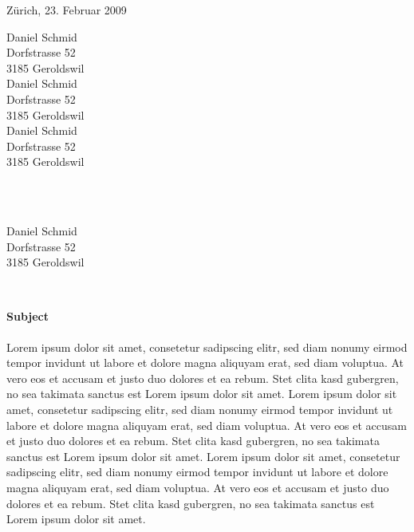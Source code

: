 \documentclass[a4paper,12pt]{letter}
\begin{document}
\thispagestyle{fancy}
\renewcommand{\headrulewidth}{0pt}
\cfoot{}

\hspace{90mm}Zürich, 23. Februar 2009
\\\par\hspace{90mm}\parbox[t][05mm]{55mm} {Daniel Schmid \\ Dorfstrasse 52 \\ 3185 Geroldswil \\ Daniel Schmid \\ Dorfstrasse 52 \\ 3185 Geroldswil \\ Daniel Schmid \\ Dorfstrasse 52 \\ 3185 Geroldswil} \\
\usebox{\areturn}\\
\parbox[t][05mm]{50mm}{Daniel Schmid \\ Dorfstrasse 52 \\ 3185 Geroldswil} \\
\vspace{20mm}
\par 
\textbf{Subject} \\\\
Lorem ipsum dolor sit amet, consetetur sadipscing elitr, sed diam nonumy eirmod tempor invidunt ut labore et dolore magna aliquyam erat, sed diam voluptua. At vero eos et accusam et justo duo dolores et ea rebum. Stet clita kasd gubergren, no sea takimata sanctus est Lorem ipsum dolor sit amet. Lorem ipsum dolor sit amet, consetetur sadipscing elitr, sed diam nonumy eirmod tempor invidunt ut labore et dolore magna aliquyam erat, sed diam voluptua. At vero eos et accusam et justo duo dolores et ea rebum. Stet clita kasd gubergren, no sea takimata sanctus est Lorem ipsum dolor sit amet. Lorem ipsum dolor sit amet, consetetur sadipscing elitr, sed diam nonumy eirmod tempor invidunt ut labore et dolore magna aliquyam erat, sed diam voluptua. At vero eos et accusam et justo duo dolores et ea rebum. Stet clita kasd gubergren, no sea takimata sanctus est Lorem ipsum dolor sit amet.   \\\\
\end{document}
